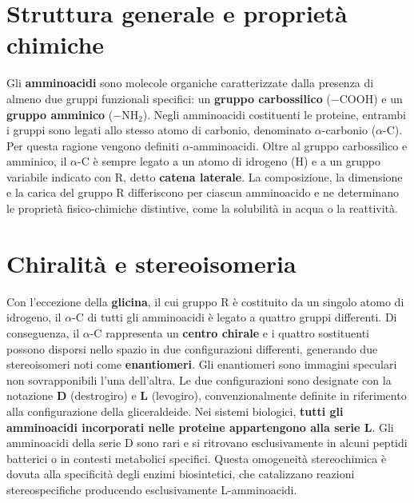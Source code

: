 \documentclass[12pt,a4paper]{report}
\begin{document}
\section{Struttura generale e proprietà chimiche}
Gli \textbf{amminoacidi} sono molecole organiche caratterizzate dalla presenza di almeno due gruppi funzionali specifici: un \textbf{gruppo carbossilico} (\(-\mathrm{COOH}\)) e un \textbf{gruppo amminico} (\(-\mathrm{NH_2}\)). Negli amminoacidi costituenti le proteine, entrambi i gruppi sono legati allo stesso atomo di carbonio, denominato \(\alpha\)-carbonio (\(\alpha\)-C). Per questa ragione vengono definiti \(\alpha\)-amminoacidi.
Oltre al gruppo carbossilico e amminico, il \(\alpha\)-C è sempre legato a un atomo di idrogeno (\(\mathrm{H}\)) e a un gruppo variabile indicato con \(\mathrm{R}\), detto \textbf{catena laterale}. La composizione, la dimensione e la carica del gruppo \(\mathrm{R}\) differiscono per ciascun amminoacido e ne determinano le proprietà fisico-chimiche distintive, come la solubilità in acqua o la reattività.

\section{Chiralità e stereoisomeria}
Con l'eccezione della \textbf{glicina}, il cui gruppo \(\mathrm{R}\) è costituito da un singolo atomo di idrogeno, il \(\alpha\)-C di tutti gli amminoacidi è legato a quattro gruppi differenti. Di conseguenza, il \(\alpha\)-C rappresenta un \textbf{centro chirale} e i quattro sostituenti possono disporsi nello spazio in due configurazioni differenti, generando due stereoisomeri noti come \textbf{enantiomeri}. Gli enantiomeri sono immagini speculari non sovrapponibili l'una dell'altra.
Le due configurazioni sono designate con la notazione \textbf{D} (destrogiro) e \textbf{L} (levogiro), convenzionalmente definite in riferimento alla configurazione della gliceraldeide. Nei sistemi biologici, \textbf{tutti gli amminoacidi incorporati nelle proteine appartengono alla serie L}. Gli amminoacidi della serie D sono rari e si ritrovano esclusivamente in alcuni peptidi batterici o in contesti metabolici specifici. Questa omogeneità stereochimica è dovuta alla specificità degli enzimi biosintetici, che catalizzano reazioni stereospecifiche producendo esclusivamente L-amminoacidi.
\end{document}
